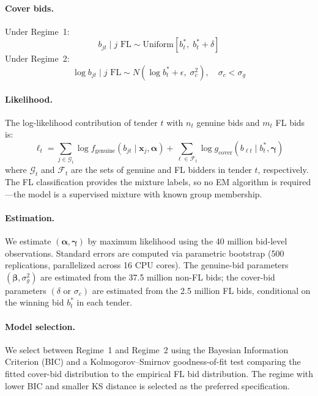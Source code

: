 \paragraph{Cover bids.} Under Regime~1:
\begin{equation}
  b_{jt} \mid j \text{ FL} \sim
  \text{Uniform}[b^*_t, \; b^*_t + \delta]
  \label{eq:cover_dist_r1}
\end{equation}
Under Regime~2:
\begin{equation}
  \log b_{jt} \mid j \text{ FL} \sim
  N\!\left(\log b^*_t + \epsilon, \; \sigma_c^2\right),
  \quad \sigma_c < \sigma_g
  \label{eq:cover_dist_r2}
\end{equation}

\paragraph{Likelihood.} The log-likelihood contribution of tender $t$
with $n_t$ genuine bids and $m_t$ FL bids is:
\begin{equation}
  \ell_t = \sum_{j \in \mathcal{G}_t} \log f_{\text{genuine}}(b_{jt}
  \mid \mathbf{x}_j, \boldsymbol{\alpha})
  + \sum_{\ell \in \mathcal{F}_t} \log g_{\text{cover}}(b_{\ell t}
  \mid b^*_t, \boldsymbol{\gamma})
  \label{eq:loglik}
\end{equation}
where $\mathcal{G}_t$ and $\mathcal{F}_t$ are the sets of genuine and
FL bidders in tender $t$, respectively. The FL classification provides
the mixture labels, so no EM algorithm is required---the model is a
supervised mixture with known group membership.

\paragraph{Estimation.} We estimate $(\boldsymbol{\alpha},
\boldsymbol{\gamma})$ by maximum likelihood using the 40 million
bid-level observations. Standard errors are computed via parametric
bootstrap (500 replications, parallelized across 16 CPU cores). The
genuine-bid parameters $(\boldsymbol{\beta}, \sigma_g^2)$ are estimated
from the 37.5 million non-FL bids; the cover-bid parameters
$(\delta \text{ or } \sigma_c)$ are estimated from the 2.5 million FL
bids, conditional on the winning bid $b^*_t$ in each tender.

\paragraph{Model selection.} We select between Regime~1 and Regime~2
using the Bayesian Information Criterion (BIC) and a Kolmogorov--Smirnov
goodness-of-fit test comparing the fitted cover-bid distribution to the
empirical FL bid distribution. The regime with lower BIC and smaller KS
distance is selected as the preferred specification.


